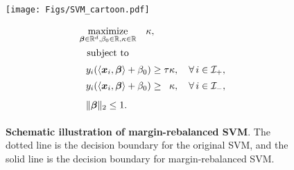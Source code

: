 \begin{figure}[h]
\noindent
\begin{minipage}[h]{0.6\textwidth}
    \texttt{[image: Figs/SVM\_cartoon.pdf]}
\end{minipage}
\hfill
\begin{minipage}[h]{0.4\textwidth}
    \begin{equation}\label{eq:SVM-m-reb}
    \begin{array}{l}
	\underset{ \vbeta \in \R^d, \beta_0 \in \R, \kappa \in \R }{ \mathrm{maximize} }  \quad \kappa, \\
	\underset{ \phantom{\smash{\vbeta \in \R^d, \beta_0 \in \R, \kappa \in \R} } }{\text{subject to}} 
        \vphantom{\dfrac12} \\
			\ \ y_i ( \langle \xx_i, \vbeta \rangle + \beta_0 ) \ge \tau \kappa,
			\quad \forall\, i \in \mathcal{I}_+, \\ 
			\ \ y_i ( \langle \xx_i, \vbeta \rangle + \beta_0 ) \ge \phantom{\tau} \kappa,
                \vphantom{\dfrac12}
			\quad \forall\, i \in \mathcal{I}_-, \\
			\ \ \|\vbeta\|_2  \le  1.  
			\vphantom{\dfrac12}
    \end{array}
    \end{equation}
\end{minipage}
    \caption{
    \textbf{Schematic illustration of margin-rebalanced SVM}. The dotted line is the decision boundary for the original SVM, and the solid line is the decision boundary for margin-rebalanced SVM.
    }
    \label{fig:SVM_cartoon}
\end{figure}


